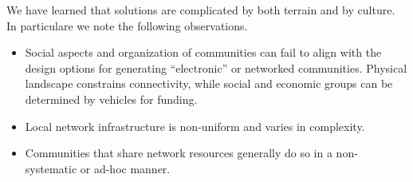 
We have learned that solutions are complicated by both terrain and by culture.
In particulare we note the following observations.
\begin{itemize}
\item Social aspects and organization of communities can fail to align with the
  design options for generating ``electronic'' or networked communities.
  Physical landscape constrains connectivity, while social and economic groups
  can be determined by vehicles for funding.
\item Local network infrastructure is non-uniform and varies in complexity.
\item Communities that share network resources generally do so in a
  non-systematic or ad-hoc manner.
\end{itemize}

